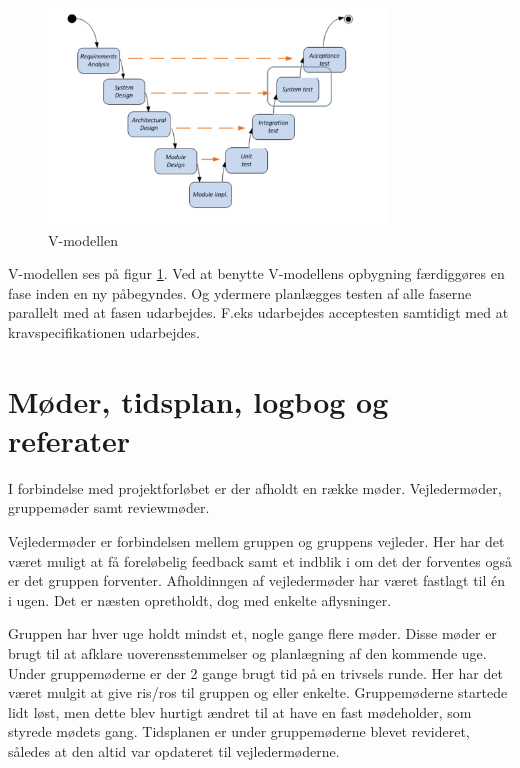 \begin{figure}[htbp]
  \centering
    \includegraphics[width=0.8\textwidth]{billeder/V-modellen}
    \caption{V-modellen}
    \label{fig:V_model}
\end{figure}

V-modellen ses på figur \ref{fig:V_model}. Ved at benytte V-modellens opbygning færdiggøres en fase inden en ny påbegyndes. Og ydermere planlægges testen af alle faserne parallelt med at fasen udarbejdes. F.eks udarbejdes acceptesten samtidigt med at kravspecifikationen udarbejdes.  




\section{Møder, tidsplan, logbog og referater}

I forbindelse med projektforløbet er der afholdt en række møder. Vejledermøder, gruppemøder samt reviewmøder.

Vejledermøder er forbindelsen mellem gruppen og gruppens vejleder. Her har det været muligt at få foreløbelig feedback samt et indblik i om det der forventes også er det gruppen forventer. Afholdinngen af vejledermøder har været fastlagt til én i ugen. Det er næsten opretholdt, dog med enkelte aflysninger.

Gruppen har hver uge holdt mindst et, nogle gange flere møder. Disse møder er brugt til at afklare uoverensstemmelser og planlægning af den kommende uge. Under gruppemøderne er der 2 gange brugt tid på en trivsels runde. Her har det været mulgit at give ris/ros til gruppen og eller enkelte. Gruppemøderne startede lidt løst, men dette blev hurtigt ændret til at have en fast mødeholder, som styrede mødets gang. Tidsplanen er under gruppemøderne blevet revideret, således at den altid var opdateret til vejledermøderne.

